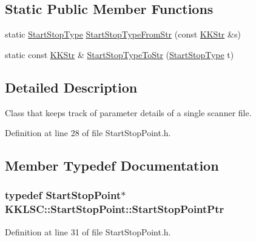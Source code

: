 \subsection*{Static Public Member Functions}
\begin{DoxyCompactItemize}
\item 
static \hyperlink{class_k_k_l_s_c_1_1_start_stop_point_aca5818602fc58bfe4c9794b311288680}{Start\+Stop\+Type} \hyperlink{class_k_k_l_s_c_1_1_start_stop_point_a1adeff9a30c508220fba9ea3a12dba0c}{Start\+Stop\+Type\+From\+Str} (const \hyperlink{class_k_k_b_1_1_k_k_str}{K\+K\+Str} \&s)
\item 
static const \hyperlink{class_k_k_b_1_1_k_k_str}{K\+K\+Str} \& \hyperlink{class_k_k_l_s_c_1_1_start_stop_point_a472847f9e408bd319f09b9937d6312d2}{Start\+Stop\+Type\+To\+Str} (\hyperlink{class_k_k_l_s_c_1_1_start_stop_point_aca5818602fc58bfe4c9794b311288680}{Start\+Stop\+Type} t)
\end{DoxyCompactItemize}


\subsection{Detailed Description}
Class that keeps track of parameter details of a single scanner file. 

Definition at line 28 of file Start\+Stop\+Point.\+h.



\subsection{Member Typedef Documentation}
\subsubsection[{\texorpdfstring{Start\+Stop\+Point\+Ptr}{StartStopPointPtr}}]{\setlength{\rightskip}{0pt plus 5cm}typedef {\bf Start\+Stop\+Point}$\ast$ {\bf K\+K\+L\+S\+C\+::\+Start\+Stop\+Point\+::\+Start\+Stop\+Point\+Ptr}}\hypertarget{class_k_k_l_s_c_1_1_start_stop_point_afcbbf85be8f397421049c64a12dec7a3}{}\label{class_k_k_l_s_c_1_1_start_stop_point_afcbbf85be8f397421049c64a12dec7a3}


Definition at line 31 of file Start\+Stop\+Point.\+h.



